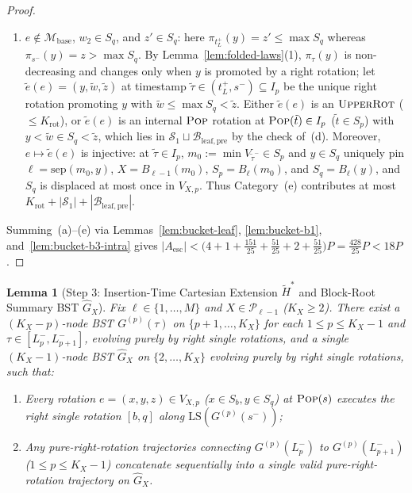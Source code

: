 \documentclass[11pt]{article}
\newtheorem{lemma}[theorem]{Lemma}
\theoremstyle{definition}
\theoremstyle{remark}
\newcommand{\LS}{\mathrm{LS}}
\newcommand{\sep}{\mathrm{sep}}
\newcommand{\POP}{\textnormal{\scshape Pop}}
\newcommand{\UPROT}{\textnormal{\scshape UpperRot}}
\begin{document}
\begin{proof}
\begin{enumerate}[label=(\alph*)]
  \item $e \notin \mathcal{M}_{\mathrm{base}}$, $w_2 \in S_q$, and $z' \in S_q$: here $\pi_{t_L^+}(y) = z' \le \max S_q$ whereas $\pi_{s^-}(y) = z > \max S_q$. By Lemma~\ref{lem:folded-laws}(1), $\pi_\tau(y)$ is non-decreasing and changes only when $y$ is promoted by a right rotation; let $\tilde{e}(e) = (y, \tilde{w}, \tilde{z})$ at timestamp $\tilde{\tau} \in (t_L^+, s^-) \subseteq I_p$ be the unique right rotation promoting $y$ with $\tilde{w} \le \max S_q < \tilde{z}$. Either $\tilde{e}(e)$ is an $\UPROT$ ($\le K_{\mathrm{rot}}$), or $\tilde{e}(e)$ is an internal $\POP$ rotation at $\POP(\tilde{t}) \in I_p$ ($\tilde{t} \in S_p$) with $y < \tilde{w} \in S_q < \tilde{z}$, which lies in $\mathcal{S}_1 \sqcup \mathcal{B}_{\mathrm{leaf,pre}}$ by the check of~(d). Moreover, $e \mapsto \tilde{e}(e)$ is injective: at $\tilde{\tau} \in I_p$, $m_0 := \min V_{\tilde{\tau}^-} \in S_p$ and $y \in S_q$ uniquely pin $\ell = \sep(m_0, y)$, $X = B_{\ell-1}(m_0)$, $S_p = B_\ell(m_0)$, and $S_q = B_\ell(y)$, and $S_q$ is displaced at most once in $V_{X, p}$. Thus Category~(e) contributes at most $K_{\mathrm{rot}} + |\mathcal{S}_1| + |\mathcal{B}_{\mathrm{leaf,pre}}|$.
\end{enumerate}
Summing~(a)--(e) via Lemmas~\ref{lem:bucket-leaf}, \ref{lem:bucket-b1}, and~\ref{lem:bucket-b3-intra} gives $|A_{\mathrm{esc}}| < \big(4 + 1 + \frac{151}{25} + \frac{51}{25} + 2 + \frac{51}{25}\big) P = \frac{428}{25} P < 18 P$.
\end{proof}

\begin{lemma}[Step 3: Insertion-Time Cartesian Extension $\widetilde{H}^*$ and Block-Root Summary BST $\widehat{G}_X$]
\label{lem:b3-quotient}
Fix $\ell \in \{1, \dots, M\}$ and $X \in \mathcal{P}_{\ell-1}$ ($K_X \ge 2$). There exist a $(K_X - p)$-node BST $G^{(p)}(\tau)$ on $\{p + 1, \dots, K_X\}$ for each $1 \le p \le K_X - 1$ and $\tau \in [L_p^-, L_{p+1}^-]$, evolving purely by right single rotations, and a single $(K_X - 1)$-node BST $\widehat{G}_X$ on $\{2, \dots, K_X\}$ evolving purely by right single rotations, such that:
\begin{enumerate}[label=(\arabic*)]
  \item Every rotation $e = (x, y, z) \in V_{X, p}$ ($x \in S_b, y \in S_q$) at $\POP(s)$ executes the right single rotation $[b, q]$ along $\LS(G^{(p)}(s^-))$;
  \item Any pure-right-rotation trajectories connecting $G^{(p)}(L_p^-)$ to $G^{(p)}(L_{p+1}^-)$ ($1 \le p \le K_X - 1$) concatenate sequentially into a single valid pure-right-rotation trajectory on $\widehat{G}_X$.
\end{enumerate}
\end{lemma}
\end{document}
